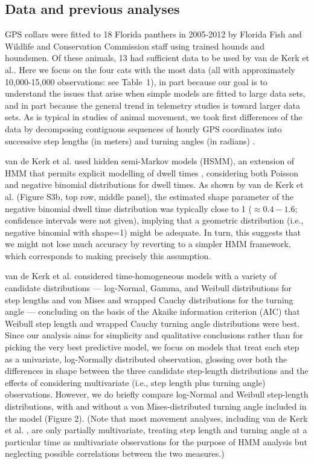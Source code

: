 \documentclass{bmcart}
\begin{document}
\subsection*{Data and previous analyses}


GPS collars were fitted to 18 Florida panthers in 2005-2012 by Florida
Fish and Wildlife and Conservation Commission staff using
trained hounds and houndsmen. Of these animals, 13 had 
sufficient data to be used by van de Kerk et al.\cite{kerk2015hidden}.
Here we focus on the four cats with the most data (all with approximately 10,000-15,000
observations: see Table~1), 
in part because our goal is to understand
the issues that arise when simple models are fitted to large data sets, and 
in part because the general trend in telemetry studies is toward larger data sets.  
As is typical in studies of animal movement, 
we took first differences of the data by decomposing
contiguous sequences of hourly GPS coordinates into 
successive step lengths (in meters) and turning angles (in radians)
\cite{turchin1998quantitative,kerk2015hidden}.


van de Kerk et al.\cite{kerk2015hidden} used hidden semi-Markov models (HSMM), 
an extension of HMM that permits explicit modelling of dwell times 
\cite{langrock_flexible_2012}, considering both Poisson and
negative binomial distributions for dwell times.  As shown 
by van de Kerk et al.\cite{kerk2015hidden} (Figure S3b, top row, middle panel),
the estimated shape parameter of the negative binomial dwell time
distribution was typically close to 1 ($\approx 0.4-1.6$; confidence
intervals were not given), implying that a geometric distribution
(i.e., negative binomial with shape=1) might be adequate. In turn,
this suggests that we might not lose much accuracy by reverting to 
a simpler HMM framework, which corresponds
to making precisely this assumption.


van de Kerk et al.\cite{kerk2015hidden} considered time-homogeneous models with 
a variety of candidate distributions %
--- log-Normal, Gamma, and Weibull distributions for step lengths
and von Mises and wrapped Cauchy distributions for the turning angle --- %
concluding on the basis of the Akaike information criterion (AIC) 
that Weibull step length and wrapped Cauchy turning angle distributions
were best.  
Since our analysis aims for simplicity and qualitative
conclusions rather than for picking the very best
predictive model, we focus on models that treat each step as
a univariate, log-Normally distributed observation, glossing
over both the differences in shape between
the three candidate step-length distributions and the effects
of considering multivariate (i.e., step length plus turning angle)
observations.  However, we do briefly compare log-Normal and Weibull
step-length distributions, with and without 
a von Mises-distributed turning angle included in the model (Figure 2).
(Note that most movement analyses, including van de Kerk et al.
\cite{kerk2015hidden}, are only partially multivariate, 
treating step length and turning angle at a particular time
as multivariate observations for the purpose of HMM
analysis but neglecting possible correlations
between the two measures.) 
\end{document}
